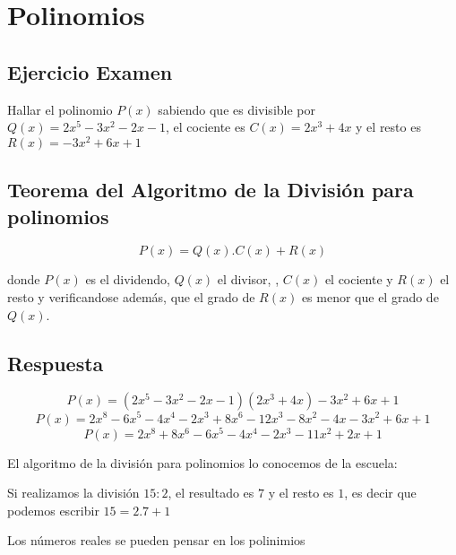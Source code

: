 \section{Polinomios}
    
    \subsection{Ejercicio Examen}
    
        Hallar el polinomio $P(x)$ sabiendo que es divisible por $Q(x)= 2x^5 - 3x^2 - 2x - 1$, el cociente es $C(x)= 2x^3 + 4x$    y el resto es $R(x) = -3x^2 + 6x + 1$
        
    
    \subsection{Teorema del Algoritmo de la División para polinomios}
    
        $$P(x)=Q(x).C(x)+R(x)$$ 
        
        donde $P(x)$ es el dividendo, $Q(x)$ el divisor, , $C(x)$ el cociente y $R(x)$ el resto y verificandose además, que el grado de $R(x)$ es menor que el grado de $Q(x)$.
    
    \subsection{Respuesta}
        
        $$ P(x)=(2x^5 - 3x^2 - 2x - 1)(2x^3 + 4x) -3x^2 + 6x + 1 $$
        $$ P(x) = 2x^8-6x^5-4x^4-2x^3+8x^6-12x^3-8x^2-4x-3x^2+6x+1$$
        $$ P(x)=2x^8+8x^6-6x^5-4x^4-2x^3-11x^2+2x+1$$
        
    
    El algoritmo de la división para polinomios lo conocemos de la escuela: 
    
    Si realizamos la división $15:2$, el resultado es $7$ y el resto es $1$, es decir que podemos escribir $15=2.7+1$
    
    Los números reales se pueden pensar en los polinimios
    